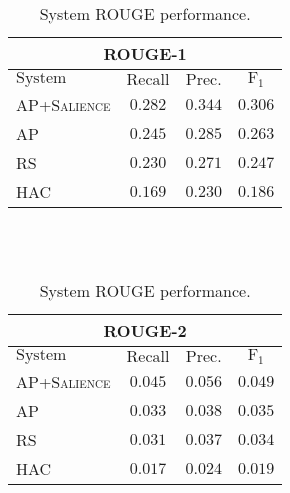 \begin{table}[h]
\centering
\begin{tabular}{l c c c}
\multicolumn{4}{c}{ROUGE-1}\\
\hline
\hline
$\mathrm{System}$ & $\mathrm{Recall}$ & $\mathrm{Prec.}$ & $\mathrm{F}_1$\\
[0.5ex]
\hline
\textsc{AP+Salience} & $\mathbf{0.282}$ & $\mathbf{0.344}$ & $\mathbf{0.306}$\\
AP          & $0.245$ & $0.285$ & $0.263$ \\
RS          & $0.230$ & $0.271$ & $0.247$ \\
HAC         & $0.169$ & $0.230$ & $0.186$ \\
\hline %
\end{tabular}
~\\[1ex]
~\\
\begin{tabular}{l c c c}
\multicolumn{4}{c}{ROUGE-2}\\
\hline
\hline
$\mathrm{System}$ & $\mathrm{Recall}$ & $\mathrm{Prec.}$ & $\mathrm{F}_1$\\[0.5ex]
\hline
\textsc{AP+Salience} & $\mathbf{0.045}$ & $\mathbf{0.056}$ & $\mathbf{0.049}$\\
AP          & $0.033$ & $0.038$ & $0.035$ \\
RS          & $0.031$ & $0.037$ & $0.034$ \\
HAC         & $0.017$ & $0.024$ & $0.019$ \\
\hline %
\end{tabular}
%
%
\caption{System ROUGE performance.} %
\label{tab:rouge}
\end{table}




